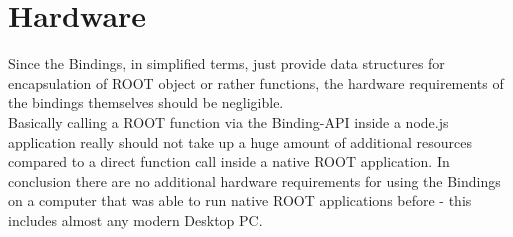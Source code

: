 \section{Hardware}
Since the Bindings, in simplified terms, just provide data structures for encapsulation of ROOT object or rather functions, the hardware requirements of the bindings themselves should be negligible.\\
Basically calling a ROOT function via the Binding-API inside a node.js application really should not take up a huge amount of additional resources compared to a direct function call inside a native ROOT application.
In conclusion there are no additional hardware requirements for using the Bindings on a computer that was able to run native ROOT applications before - this includes almost any modern Desktop PC.
